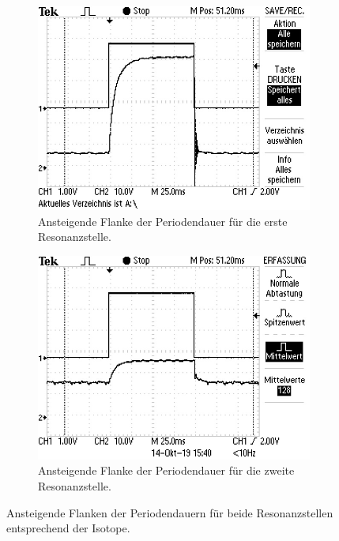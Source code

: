 \begin{figure}
  \centering
  \begin{subfigure}{0.46\textwidth}
    \centering
    \includegraphics[angle=90, width=\textwidth]{bilder/flanke1.jpg}
    \caption{Ansteigende Flanke der Periodendauer für die erste Resonanzstelle.}
    \label{sub-abb:87}
  \end{subfigure}
  \qquad
  \begin{subfigure}{0.46\textwidth}
    \centering
    \includegraphics[angle=90, width=\textwidth]{bilder/flanke2.jpg}
    \caption{Ansteigende Flanke der Periodendauer für die zweite Resonanzstelle.}
    \label{sub-abb:85}
  \end{subfigure}
  \caption{Ansteigende Flanken der Periodendauern für beide Resonanzstellen entsprechend der Isotope.}
  \label{abb:ansteigende-flanken}
\end{figure}
